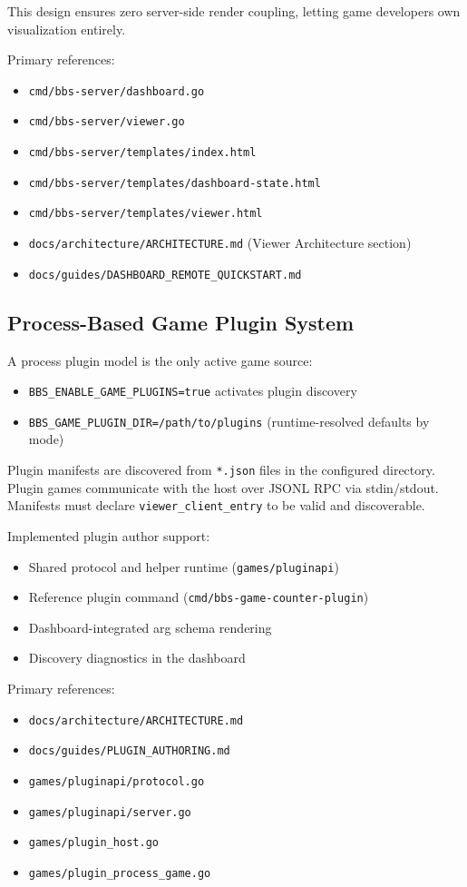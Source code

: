 \documentclass[11pt]{article}
\begin{document}
This design ensures zero server-side render coupling, letting game developers own visualization entirely.

Primary references:
\begin{itemize}[leftmargin=*]
  \item \texttt{cmd/bbs-server/dashboard.go}
  \item \texttt{cmd/bbs-server/viewer.go}
  \item \texttt{cmd/bbs-server/templates/index.html}
  \item \texttt{cmd/bbs-server/templates/dashboard-state.html}
  \item \texttt{cmd/bbs-server/templates/viewer.html}
  \item \texttt{docs/architecture/ARCHITECTURE.md} (Viewer Architecture section)
  \item \texttt{docs/guides/DASHBOARD\_REMOTE\_QUICKSTART.md}
\end{itemize}

\subsection{Process-Based Game Plugin System}
A process plugin model is the only active game source:
\begin{itemize}[leftmargin=*]
  \item \texttt{BBS\_ENABLE\_GAME\_PLUGINS=true} activates plugin discovery
  \item \texttt{BBS\_GAME\_PLUGIN\_DIR=/path/to/plugins} (runtime-resolved defaults by mode)
\end{itemize}

Plugin manifests are discovered from \texttt{*.json} files in the configured directory. Plugin games communicate with the host over JSONL RPC via stdin/stdout. Manifests must declare \texttt{viewer\_client\_entry} to be valid and discoverable.

Implemented plugin author support:
\begin{itemize}[leftmargin=*]
  \item Shared protocol and helper runtime (\texttt{games/pluginapi})
  \item Reference plugin command (\texttt{cmd/bbs-game-counter-plugin})
  \item Dashboard-integrated arg schema rendering
  \item Discovery diagnostics in the dashboard
\end{itemize}

Primary references:
\begin{itemize}[leftmargin=*]
  \item \texttt{docs/architecture/ARCHITECTURE.md}
  \item \texttt{docs/guides/PLUGIN\_AUTHORING.md}
  \item \texttt{games/pluginapi/protocol.go}
  \item \texttt{games/pluginapi/server.go}
  \item \texttt{games/plugin\_host.go}
  \item \texttt{games/plugin\_process\_game.go}
\end{itemize}
\end{document}
